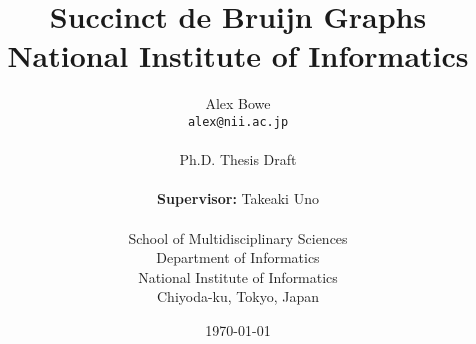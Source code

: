 \documentclass[12pt,a4paper,twoside,width=150mm,top=25mm,bottom=25mm]{report}
\begin{document}
\title{
  {Succinct de Bruijn Graphs} \\
  {\large National Institute of Informatics}}
\author{Alex Bowe\\
\texttt{alex@nii.ac.jp} \\ \\
Ph.D. Thesis Draft\\ \\
\textbf{Supervisor:} Takeaki Uno\\ \\
School of Multidisciplinary Sciences \\
Department of Informatics \\
National Institute of Informatics \\
Chiyoda-ku, Tokyo, Japan}

\date{\today}

\maketitle



%


%

\setcounter{tocdepth}{1}
\newpage
\tableofcontents
\newpage

%

%

%

%

%

%

%

%

%

%

%
%
\end{document}
